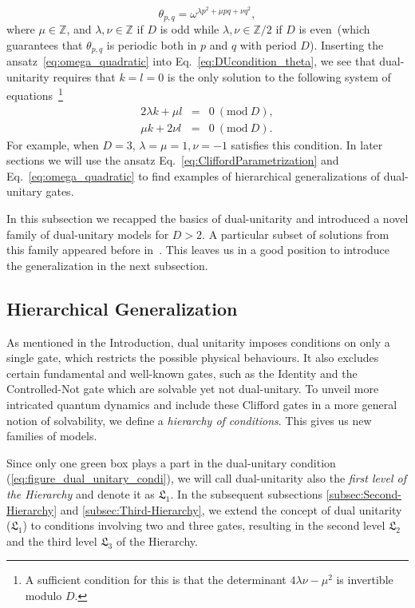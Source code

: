 \documentclass[aps,prx,twocolumn,notitlepage,nofootinbib,nobalancelastpage]{revtex4-2}
\theoremstyle{break}
\newcommand{\1}{\mathbbm{1}}
\theoremstyle{plain}
\theoremstyle{plain}
\theoremstyle{plain}
\newcommand{\pk}[1]{{\color{blue}[#1]}}
\begin{document}
\begin{equation}\label{eq:omega_quadratic}
    \theta_{p,q}=\omega^{\lambda p^2+\mu pq+\nu q^2},
\end{equation}
where $\mu\in\mathbb{Z}$, and $\lambda,\nu\in\mathbb{Z}$ if $D$ is odd while $\lambda,\nu\in\mathbb{Z}/2$ if $D$ is even~(which guarantees that $\theta_{p,q}$ is periodic both in $p$ and $q$ with period $D$). Inserting the ansatz~\eqref{eq:omega_quadratic} into Eq.~\eqref{eq:DUcondition_theta}, we see that dual-unitarity requires that $k=l=0$ is the only solution to the following system of equations~\footnote{A sufficient condition for this is that the determinant $4\lambda\nu-\mu^2$ is invertible modulo $D$. }
\begin{eqnarray}
    2\lambda k+\mu l&=&0~(\mathrm{mod}~D),\nonumber\\
    \mu k+2\nu l&=&0~(\mathrm{mod}~D).
\end{eqnarray}
For example, when $D=3$, $\lambda=\mu=1,\nu=-1$ satisfies this condition. In later sections we will use the ansatz Eq.~\eqref{eq:CliffordParametrization} and Eq.~\eqref{eq:omega_quadratic} to find examples of hierarchical generalizations of dual-unitary gates. 

In this subsection we recapped the basics of dual-unitarity and introduced a novel family of dual-unitary models for $D>2$. A particular subset of solutions from this family appeared before in~\cite{marton2022construction}. This leaves us in a good position to introduce the generalization in the next subsection.

\subsection{Hierarchical Generalization}\label{sec:HG}

As mentioned in the Introduction, dual unitarity imposes conditions on only a single gate, which restricts the possible physical behaviours. It also excludes certain fundamental and well-known gates, such as the Identity and the Controlled-Not gate which are solvable yet not dual-unitary. 
To unveil more intricated quantum dynamics and include these Clifford gates in a more general notion of solvability,
 we define a \emph{hierarchy of conditions}. This gives us new families of  models.
 

Since only one green box plays a part in the dual-unitary condition
(\ref{eq:figure_dual_unitary_condi}), we will call dual-unitarity  also the \emph{first level of the Hierarchy} and denote it as $\mathfrak{L}_1$.
In the subsequent subsections \ref{subsec:Second-Hierarchy}
and \ref{subsec:Third-Hierarchy}, we extend the concept of dual unitarity
($\mathfrak{L}_1$) to conditions involving two and three gates, resulting in the second level $\mathfrak{L}_2$ and
the third level $\mathfrak{L}_3$ of the Hierarchy. %
\end{document}
